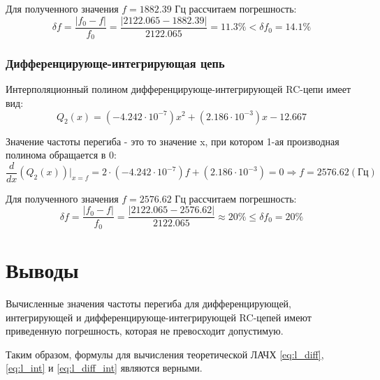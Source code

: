 \documentclass[a4paper,14pt]{extarticle}
\begin{document}
Для полученного значения $f = 1882.39$ Гц рассчитаем погрешность:
\[
\delta f = \frac{|f_0 - f|}{f_0} = \frac{|2122.065 - 1882.39|}{2122.065} = 11.3 \% < \delta f_0 = 14.1\%
\]

\subsubsection{Дифференцирующе-интегрирующая цепь}

Интерполяционный полином дифференцирующе-интегрирующей RC-цепи имеет вид:\\
\[
Q_2(x) = (-4.242 \cdot 10^{-7})x^2 + (2.186 \cdot 10^{-3})x - 12.667
\]

Значение частоты перегиба - это то значение x, при котором 1-ая производная полинома обращается в 0:
\[
\frac{d}{dx} (Q_2(x))\Big|_{x=f} = 2 \cdot (-4.242 \cdot 10^{-7})f + (2.186 \cdot 10^{-3}) = 0 \Rightarrow f = 2576.62 (\text{Гц})
\]

Для полученного значения $f = 2576.62$ Гц рассчитаем погрешность:
\[
\delta f = \frac{|f_0 - f|}{f_0} = \frac{|2122.065 - 2576.62|}{2122.065} \approx 20 \% \leq \delta f_0 = 20\%
\]
  
\section{Выводы}

Вычисленные значения частоты перегиба для дифференцирующей, интегрирующей и дифференцирующе-интегрирующей RC-цепей имеют приведенную погрешность, которая не превосходит допустимую. 

Таким образом, формулы для вычисления теоретической ЛАЧХ \ref{eq:l_diff}, \ref{eq:l_int} и \ref{eq:l_diff_int} являются верными.
\end{document}
